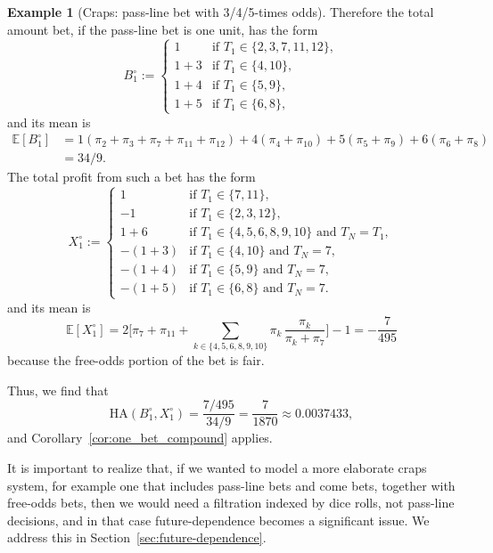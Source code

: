 \documentclass{article}
\theoremstyle{definition}
\newtheorem{example}[theorem]{Example}
\theoremstyle{remark}
\newcommand{\E}{\mathbb{E}}
\newcommand{\HA}{\mathrm{HA}}
\begin{document}
\begin{example}[Craps: pass-line bet with 3/4/5-times odds]
Therefore the total amount bet, if the pass-line bet is one unit, has the form
\[
B_1^\circ:=\begin{cases}1&\text{if $T_1\in\{2,3,7,11,12\}$},\\
                       1+3&\text{if $T_1\in\{4,10\}$},\\
                       1+4&\text{if $T_1\in\{5,9\}$},\\
                       1+5&\text{if $T_1\in\{6,8\}$},\end{cases}
\]
and its mean is
\begin{align*}
\E[B_1^\circ]&=1(\pi_2+\pi_3+\pi_7+\pi_{11}+\pi_{12})+4(\pi_4+\pi_{10})+5(\pi_5+\pi_9)+6(\pi_6+\pi_8)\\
&=34/9.
\end{align*}
The total profit from such a bet has the form
\[
X_1^\circ:=\begin{cases}1&\text{if $T_1\in\{7,11\}$},\\
                       -1&\text{if $T_1\in\{2,3,12\}$},\\
                       1+6&\text{if $T_1\in\{4,5,6,8,9,10\}$ and $T_N=T_1$},\\
                       -(1+3)&\text{if $T_1\in\{4,10\}$ and $T_N=7$},\\
                       -(1+4)&\text{if $T_1\in\{5,9\}$ and $T_N=7$},\\
                       -(1+5)&\text{if $T_1\in\{6,8\}$ and $T_N=7$}.\end{cases}
\]
and its mean is
\[
\E[X_1^\circ]=2\bigg[\pi_7+\pi_{11}+\sum_{k\in\{4,5,6,8,9,10\}}\pi_k\,\frac{\pi_k}{\pi_k+\pi_7}\bigg]-1=-\frac{7}{495}
\]
because the free-odds portion of the bet is fair.

Thus, we find that
\[
\HA(B_1^\circ,X_1^\circ)=\frac{7/495}{34/9}=\frac{7}{1870}\approx0.0037433,
\]
and Corollary~\ref{cor:one_bet_compound} applies.

It is important to realize that, if we wanted to model a more elaborate craps system, for example one that includes pass-line bets and come bets, together with free-odds bets, then we would need a filtration indexed by dice rolls, not pass-line decisions, and in that case future-dependence becomes a significant issue.  We address this in Section~\ref{sec:future-dependence}.
\end{example}
\end{document}

